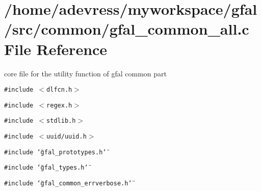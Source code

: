 \section{/home/adevress/myworkspace/gfal/src/common/gfal\_\-common\_\-all.c File Reference}
\label{gfal__common__all_8c}
core file for the utility function of gfal common part 

{\tt \#include $<$dlfcn.h$>$}\par
{\tt \#include $<$regex.h$>$}\par
{\tt \#include $<$stdlib.h$>$}\par
{\tt \#include $<$uuid/uuid.h$>$}\par
{\tt \#include \char`\"{}gfal\_\-prototypes.h\char`\"{}}\par
{\tt \#include \char`\"{}gfal\_\-types.h\char`\"{}}\par
{\tt \#include \char`\"{}gfal\_\-common\_\-errverbose.h\char`\"{}}\par
